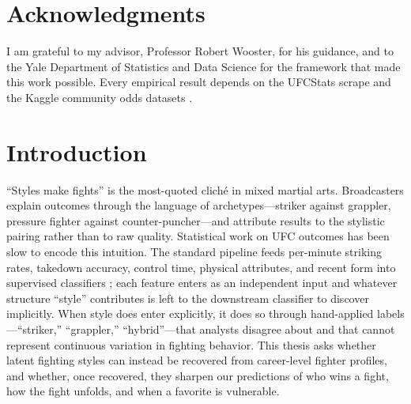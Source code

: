 \documentclass[12pt,oneside]{report}
\begin{document}
\newpage
{}


\singlespacing
{}
\tableofcontents
{}

\clearpage\chapter*{Acknowledgments}

I am grateful to my advisor, Professor Robert Wooster, for his
guidance, and to the Yale Department of Statistics and Data Science
for the framework that made this work possible.  Every empirical
result depends on the UFCStats scrape and the Kaggle community odds
datasets \citep{ufckagglealibi,ufcoddskaggle}.

\normalsize
\newpage
{}
\onehalfspacing
\setlength{\parindent}{1.5em}


\chapter{Introduction}\label{ch:introduction}

``Styles make fights'' is the most-quoted cliché in mixed martial
arts.  Broadcasters explain outcomes through the language of
archetypes---striker against grappler, pressure fighter against
counter-puncher---and attribute results to the stylistic pairing
rather than to raw quality.  Statistical work on UFC outcomes has been
slow to encode this intuition.  The standard pipeline feeds per-minute striking rates, takedown accuracy, control time,
physical attributes, and recent form into supervised classifiers
\citep{hitkul2019mma,yin2024mma,sheng2024ufc}; each
feature enters as an independent input and whatever structure
``style'' contributes is left to the downstream classifier to
discover implicitly.  When style does enter explicitly, it does so
through hand-applied labels---``striker,'' ``grappler,''
``hybrid''---that analysts disagree about and that cannot represent
continuous variation in fighting behavior.  This thesis asks whether
latent fighting styles can instead be recovered from career-level
fighter profiles, and whether, once recovered, they sharpen our
predictions of who wins a fight, how the fight unfolds,
and when a favorite is vulnerable.
\end{document}
